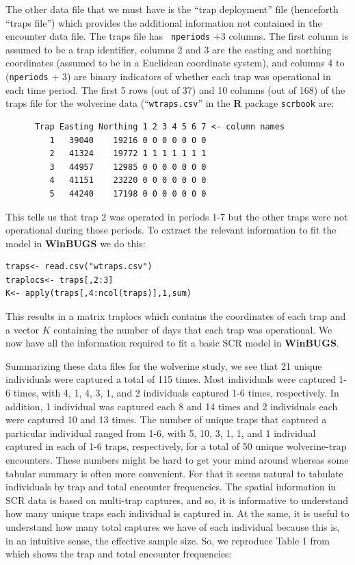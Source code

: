 The other data file that we must have is the ``trap deployment'' file
(henceforth ``traps file'') which provides the additional information
not contained in the encounter data file. The traps file has \mbox{\tt
  nperiods} $+ 3$ columns. The first column is assumed to be a trap identifier,
columns 2 and 3 are the easting and northing coordinates (assumed to
be in a Euclidean coordinate system), and columns 4 to (\mbox{\tt nperiods} + 3)
are binary indicators of whether each trap was operational in each
time period. The first 5 rows (out of 37) and 10 columns (out of 168)
of the traps file for the wolverine data (``\mbox{\tt wtraps.csv}'' in
the {\bf R} package \mbox{\tt scrbook} are:
\begin{verbatim}
      Trap Easting Northing 1 2 3 4 5 6 7 <- column names
         1   39040    19216 0 0 0 0 0 0 0
         2   41324    19772 1 1 1 1 1 1 1
         3   44957    12985 0 0 0 0 0 0 0
         4   41151    23220 0 0 0 0 0 0 0
         5   44240    17198 0 0 0 0 0 0 0
\end{verbatim}
This tells us that trap 2 was operated in periods 1-7 but the other
traps were not operational during those periods. To extract the
relevant information to fit the model in {\bf WinBUGS} we do this:
\begin{verbatim}
traps<- read.csv("wtraps.csv")
traplocs<- traps[,2:3]
K<- apply(traps[,4:ncol(traps)],1,sum)
\end{verbatim}
This results in a matrix traplocs which contains the coordinates of
each trap and a vector $K$ containing the number of days that each trap
was operational. We now have all the information required to fit a
basic SCR model in {\bf WinBUGS}.

Summarizing these data files for the wolverine study, we see that 21
unique individuals were captured a total of 115 times. Most
individuals were captured 1-6 times, with 4, 1, 4, 3, 1, and 2
individuals captured 1-6 times, respectively.  In addition, 1
individual was captured each 8 and 14 times and 2 individuals each
were captured 10 and 13 times.  The number of unique traps that
captured a particular individual ranged from 1-6, with 5, 10, 3, 1, 1,
and 1 individual captured in each of 1-6 traps, respectively, for a
total of 50 unique wolverine-trap encounters.  These numbers might be
hard to get your mind around whereas some tabular summary is often
more convenient. For that it seems natural to tabulate individuals by
trap and total encounter frequencies. The spatial information in SCR
data is based on multi-trap captures, and so, it is informative to
understand how many unique traps each individual is captured in. At
the same, it is useful to understand how many total captures we have
of each individual because this is, in an intuitive sense, the
effective sample size.  So, we reproduce Table 1 from
\citet{royle_etal:2011jwm} which shows the trap and total encounter
frequencies:

